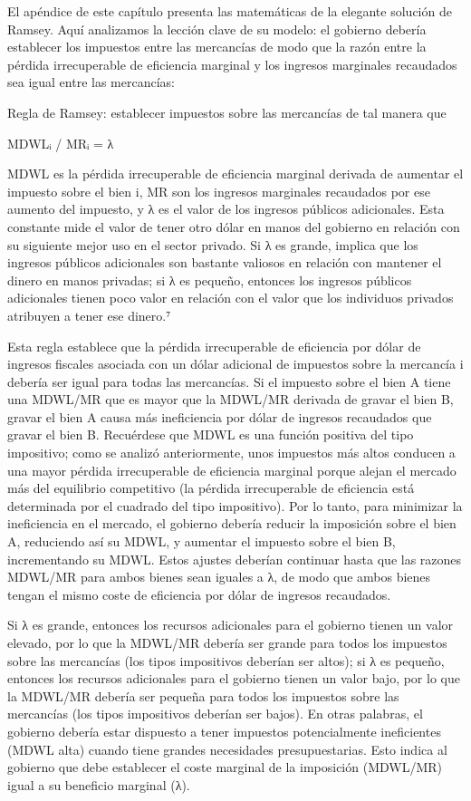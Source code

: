 \documentclass[10pt,a4paper]{article}
\begin{document}
El apéndice de este capítulo presenta las matemáticas de la elegante solución de Ramsey. Aquí analizamos la lección clave de su modelo: el gobierno debería establecer los impuestos entre las mercancías de modo que la razón entre la pérdida irrecuperable de eficiencia marginal y los ingresos marginales recaudados sea igual entre las mercancías:

Regla de Ramsey: establecer impuestos sobre las mercancías de tal manera que

MDWLᵢ / MRᵢ = λ

MDWL es la pérdida irrecuperable de eficiencia marginal derivada de aumentar el impuesto sobre el bien i, MR son los ingresos marginales recaudados por ese aumento del impuesto, y λ es el valor de los ingresos públicos adicionales. Esta constante mide el valor de tener otro dólar en manos del gobierno en relación con su siguiente mejor uso en el sector privado. Si λ es grande, implica que los ingresos públicos adicionales son bastante valiosos en relación con mantener el dinero en manos privadas; si λ es pequeño, entonces los ingresos públicos adicionales tienen poco valor en relación con el valor que los individuos privados atribuyen a tener ese dinero.⁷

Esta regla establece que la pérdida irrecuperable de eficiencia por dólar de ingresos fiscales asociada con un dólar adicional de impuestos sobre la mercancía i debería ser igual para todas las mercancías. Si el impuesto sobre el bien A tiene una MDWL/MR que es mayor que la MDWL/MR derivada de gravar el bien B, gravar el bien A causa más ineficiencia por dólar de ingresos recaudados que gravar el bien B. Recuérdese que MDWL es una función positiva del tipo impositivo; como se analizó anteriormente, unos impuestos más altos conducen a una mayor pérdida irrecuperable de eficiencia marginal porque alejan el mercado más del equilibrio competitivo (la pérdida irrecuperable de eficiencia está determinada por el cuadrado del tipo impositivo). Por lo tanto, para minimizar la ineficiencia en el mercado, el gobierno debería reducir la imposición sobre el bien A, reduciendo así su MDWL, y aumentar el impuesto sobre el bien B, incrementando su MDWL. Estos ajustes deberían continuar hasta que las razones MDWL/MR para ambos bienes sean iguales a λ, de modo que ambos bienes tengan el mismo coste de eficiencia por dólar de ingresos recaudados.

Si λ es grande, entonces los recursos adicionales para el gobierno tienen un valor elevado, por lo que la MDWL/MR debería ser grande para todos los impuestos sobre las mercancías (los tipos impositivos deberían ser altos); si λ es pequeño, entonces los recursos adicionales para el gobierno tienen un valor bajo, por lo que la MDWL/MR debería ser pequeña para todos los impuestos sobre las mercancías (los tipos impositivos deberían ser bajos). En otras palabras, el gobierno debería estar dispuesto a tener impuestos potencialmente ineficientes (MDWL alta) cuando tiene grandes necesidades presupuestarias. Esto indica al gobierno que debe establecer el coste marginal de la imposición (MDWL/MR) igual a su beneficio marginal (λ).
\end{document}
